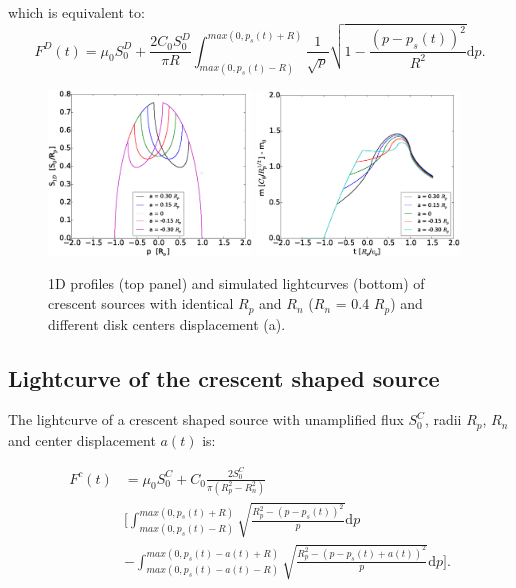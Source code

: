 \documentclass[usenatbib]{mn2e}
\begin{document}
which is equivalent to:
\begin{equation}
 F^D(t) = \mu_0 S_0^D + \frac{2 C_0 S_0^D}{\pi R} \int_{max(0, p_s(t) - R)}^{max(0, p_s(t) + R)} \frac{1}{\sqrt{p}} \sqrt{1 - \frac{\left( p-p_s(t) \right)^2}{R^2}} \mathrm{d}p.
\end{equation}

\begin{figure}
\centering
    \includegraphics[width = 0.48\textwidth]{figures/S1D_var_a.eps}
    \includegraphics[width = 0.48\textwidth]{figures/4avar_magnification.eps}
\caption{\label{fig:a_var} 1D profiles (top panel) and simulated lightcurves 
(bottom) of crescent sources with identical $R_p$ and $R_n$ ($R_n$ = 0.4 $R_p$) and different disk centers displacement (a).}
\end{figure}


\subsection{Lightcurve of the crescent shaped source}

The lightcurve of a crescent shaped source with unamplified flux $S_0^C$, radii $R_p$, $R_n$ and center displacement $a(t)$ is:


\begin{equation}
\begin{aligned}
 F^c(t) &= \mu_0 S_0^C + C_0 \frac{2 S_0^C}{\pi \left( R_p^2 -R_n^2 \right) } \\
    &\bigg[ \int_{max(0, p_s(t) - R)}^{max(0, p_s(t) + R)} \sqrt{\frac{R_p^2 - \left( p-p_s(t) \right)^2 }{p}} \mathrm{d}p \\
    &  -  \int_{max(0, p_s(t) - a(t) - R)}^{max(0, p_s(t) -a(t) + R)} \sqrt{\frac{R_p^2 - \left( p-p_s(t) +a(t) \right)^2 }{p}} \mathrm{d}p  \bigg] .
\end{aligned}
\end{equation}
\end{document}
